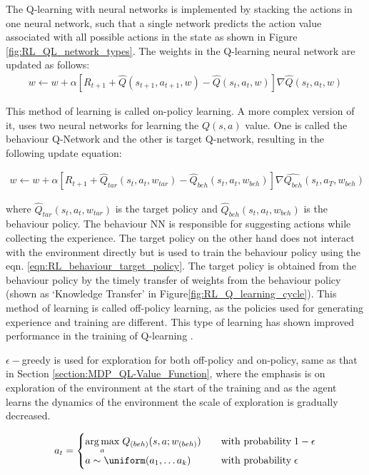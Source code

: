 The Q-learning with neural networks is implemented by stacking the actions in one neural network, such that a single network predicts the action value associated with all possible actions in the state as shown in Figure \ref{fig:RL_QL_network_types}.
The weights in the Q-learning neural network are updated as follows:
\begin{align}
    w \longleftarrow w + \alpha [R_{t+1} + \hat{Q}(s_{t+1},a_{t+1}, w) - \hat{Q}(s_t,a_t, w)]\nabla \hat{Q}(s_t, a_t, w)
\end{align}

This method of learning is called on-policy learning. A more complex version of it, uses two neural networks for learning the $Q(s,a)$ value. One is called the behaviour Q-Network and the other is target Q-network, resulting in the following update equation:

\begin{align}
    w \longleftarrow w + \alpha [R_{t+1} + \hat{Q}_{tar}(s_t,a_t, w_{tar}) - \hat{Q}_{beh}(s_t,a_t, w_{beh})]\nabla \hat{Q_{beh}}(s_t, a_T, w_{beh}) \label{eqn:RL_behaviour_target_policy}
\end{align}

where $\hat{Q}_{tar}(s_t,a_t, w_{tar})$ is the target policy and $\hat{Q}_{beh}(s_t,a_t, w_{beh})$ is the behaviour policy. The behaviour NN is responsible for suggesting actions while collecting the experience. The target policy on the other hand does not interact with the environment directly but is used to train the behaviour policy using the eqn. \ref{eqn:RL_behaviour_target_policy}. The target policy is obtained from the behaviour policy by the timely transfer of weights from the behaviour policy (shown as `Knowledge Transfer' in Figure\ref{fig:RL_Q_learning_cycle}). This method of learning is called off-policy learning, as the policies used for generating experience and training are different. This type of learning has shown improved performance in the training of Q-learning \parencite{hasselt2010double}.

$\epsilon-$greedy is used for exploration for both off-policy and on-policy, same as that in Section \ref{section:MDP_QL-Value_Function}, where the emphasis is on exploration of the environment at the start of the training and as the agent learns the dynamics of the environment the scale of exploration is gradually decreased.

\begin{align}
    a_t  = 
    \begin{cases}
        \underset{a}{\arg\max} \; Q_{(beh)}(s, a; w_{(beh)}) \quad & \text{with probability} \; 1- \epsilon \\
        a \sim \uniform (a_1, \hdots a_k) \quad & \text{with probability} \; \epsilon
    \end{cases}
\end{align}

